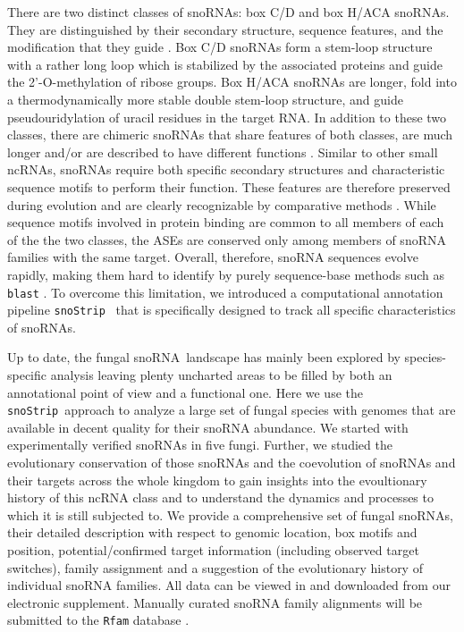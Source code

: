 \documentclass[preprint,3p,times,twocolumn]{elsarticle}
\newcommand{\NEW}[1]{\begingroup\color{blue}#1\endgroup}
\newcommand{\sno}{snoRNA}
\newcommand{\snostrip}{\texttt{snoStrip}}
\begin{document}
There are two distinct classes of snoRNAs: box C/D and box H/ACA
snoRNAs.  They are distinguished by their secondary structure,
sequence features, and the modification that they guide
\cite{Balakin:1996,Tollervey:1997}.  Box C/D snoRNAs form a stem-loop
structure with a rather long loop which is stabilized by the
associated proteins and guide the 2'-O-methylation of ribose groups.
Box H/ACA snoRNAs are longer, fold into a thermodynamically more
stable double stem-loop structure, and guide pseudouridylation of
uracil residues in the target RNA.  In addition to these two classes,
there are chimeric snoRNAs that share features of both classes, are
much longer and/or are described to have different functions
\cite{Darzacq:2002}. Similar to other small ncRNAs, snoRNAs require
both specific secondary structures and characteristic sequence motifs
to perform their function. These features are therefore preserved
during evolution and are clearly recognizable by comparative methods
\cite{Ganot:1997,Tollervey:1997}. While sequence motifs involved in
protein binding are common to all members of each of the the two
classes, the ASEs are conserved only among members of snoRNA families
with the same target. Overall, therefore, snoRNA sequences evolve
rapidly, making them hard to identify by purely sequence-base methods
such as \texttt{blast} \cite{Altschul:1990}. To overcome this
limitation, we introduced a computational annotation pipeline
\snostrip\ \cite{Bartschat:2014} that is specifically designed to
track all specific characteristics of snoRNAs.

\NEW{Up to date, the fungal \sno\ landscape has mainly been explored
  by species-specific analysis leaving plenty uncharted areas to be
  filled by both an annotational point of view and a functional one.}
Here we use the \snostrip\ approach to analyze a large set of fungal
species with genomes that are available in decent quality for their
snoRNA abundance.  We started with experimentally verified snoRNAs in
five fungi.  Further, we studied the evolutionary conservation of
those snoRNAs and the coevolution of snoRNAs and their targets
\NEW{across the whole kingdom to gain insights into the evoultionary
  history of this ncRNA class and to understand the dynamics and
  processes to which it is still subjected to.} We provide a
comprehensive set of fungal snoRNAs, their detailed description with
respect to genomic location, box motifs and position,
potential/confirmed target information (including observed target
switches), family assignment and a suggestion of the evolutionary
history of individual snoRNA families.  All data can be viewed in and
downloaded from our electronic supplement. Manually curated snoRNA
family alignments will be submitted to the \texttt{Rfam} database
\cite{Nawrocki:2015}.
\end{document}
